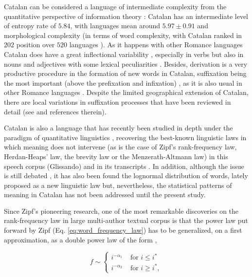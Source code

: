 \documentclass[10pt,letterpaper]{article}
\begin{document}
Catalan can be considered a language of intermediate complexity from the quantitative perspective of information theory \cite{bentz2018adaptive}: Catalan has an intermediate level of 
entropy rate of $5.84$, with languages mean around $5.97 \pm 0.91$  \cite{Bentzetal2017} and morphological complexity (in terms of word complexity, with Catalan ranked in $202$ position over $520$ languages  \cite{bentz2016}). 
As it happens with other Romance languages Catalan does have a great inflectional variability \cite{kabatek2011romance}, especially in verbs but also in nouns and adjectives \cite{clua2002} with some lexical peculiarities \cite{Montermini2010}. Besides, derivation is a very productive procedure in the formation of new words in Catalan, suffixation being the most important (above the prefixation and infixation) \cite{domenech_estopa_2011}, as it is also usual in other Romance languages \cite{kabatek2011romance}. Despite the limited geographical extension of Catalan, there are local variations in suffixation processes that have been reviewed in detail (see \cite{domenech_estopa_2011} and references therein).

Catalan is also a language that has recently been studied in depth under the paradigm of quantitative linguistics \cite{kohler2008quantitative}, recovering the best-known linguistic laws in which meaning does not intervene (as is the case of Zipf's rank-frequency law, Herdan-Heaps' law, the brevity law or the Menzerath-Altmann law) in this speech corpus (Glissando) and in its transcripts \cite{entropy2019}. In addition, although the issue is still debated \cite{CorralSerra2020}, it has also been found the lognormal distribution of words, lately proposed as a new linguistic law \cite{RSOS2019, entropy2019} but, nevertheless, the statistical patterns of meaning in Catalan has not been addressed until the present study.

Since Zipf's pioneering research, one of the most remarkable discoveries on the rank-frequency law in large multi-author textual corpus is that the power law put forward by Zipf (Eq. \ref{eq:word_frequency_law}) has to be generalized, on a first approximation, as a double power law of the form \cite{ferrer2001two,MONTEMURRO2001, Williams2015, petersen2012languages, montemurro2002new, GerlachAltmann2013},

\begin{equation}
f \sim \left\{ 
     \begin{array}{lll}
     i^{-\alpha_1} & \mbox{~for~} i \leq i^* \\
     i^{-\alpha_2} & \mbox{~for~} i \geq i^*,
     \end{array} 
    \right.   
\label{eq:word_frequency_law_2_regimes}
\end{equation}
\end{document}
